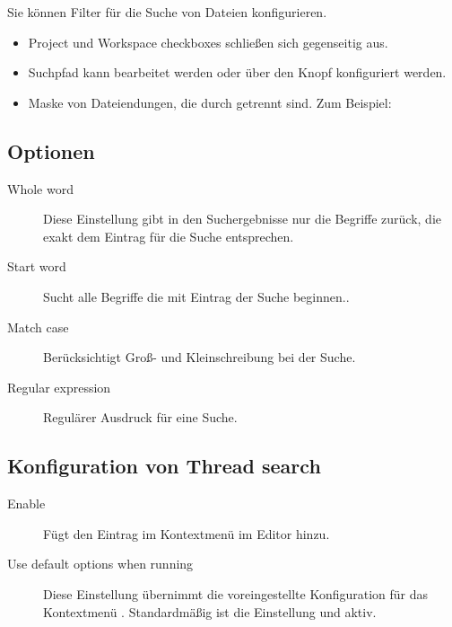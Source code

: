 
Sie können Filter für die Suche von Dateien konfigurieren.

\begin{itemize}
\item Project und Workspace checkboxes schließen sich gegenseitig aus.
\item Suchpfad kann bearbeitet werden oder über den Knopf  konfiguriert werden.
\item Maske von Dateiendungen, die durch \samp{;} getrennt sind. Zum Beispiel: 
\end{itemize}

\subsection{Optionen}

\begin{description}
\item[Whole word] Diese Einstellung gibt in den Suchergebnisse nur die Begriffe zurück, die exakt dem Eintrag für die Suche entsprechen.
\item[Start word] Sucht alle Begriffe die mit Eintrag der Suche beginnen..
\item[Match case] Berücksichtigt Groß- und Kleinschreibung bei der Suche.
\item[Regular expression] Regulärer Ausdruck für eine Suche.
\end{description}


\subsection{Konfiguration von Thread search}

\begin{description}
\item[Enable ] Fügt den Eintrag  im Kontextmenü im Editor hinzu.
\item[Use default options when running ] Diese Einstellung übernimmt die voreingestellte Konfiguration für das Kontextmenü . Standardmäßig ist die Einstellung  und  aktiv.
\end{description}

